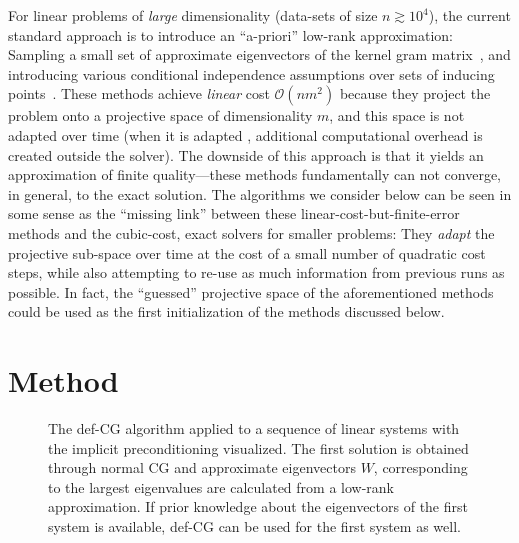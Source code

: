 \documentclass{article}
\begin{document}
For linear problems of \emph{large} dimensionality (data-sets of size $n\gtrsim 10^4$), the current standard approach is to introduce an ``a-priori'' low-rank approximation: Sampling a small set of approximate eigenvectors of the kernel gram matrix~\cite{NIPS2007_3182,NIPS2008_3495}, and introducing various conditional independence assumptions over sets of inducing points~\cite{NIPS2000_1866,quinonero05,snelson07a}. These methods achieve \emph{linear} cost $\mathcal{O}(nm^2)$ because they project the problem onto a projective space of dimensionality $m$, and this space is not adapted over time (when it is adapted \cite{titsias09a}, additional computational overhead is created outside the solver). The downside of this approach is that it yields an approximation of finite quality---these methods fundamentally can not converge, in general, to the exact solution. The algorithms we consider below can be seen in some sense as the ``missing link'' between these linear-cost-but-finite-error methods and the cubic-cost, exact solvers for smaller problems: They \emph{adapt} the projective sub-space over time at the cost of a small number of quadratic cost steps, while also attempting to re-use as much information from previous runs as possible. In fact, the ``guessed'' projective space of the aforementioned methods could be used as the first initialization of the methods discussed below.

\section{Method}
\label{sec:method}

\begin{figure}
\centering
\def\svgwidth{\linewidth}

\caption{\label{fig:def_cg} The def-CG algorithm applied to a sequence of linear systems with the implicit preconditioning visualized. The first solution is obtained through normal CG and approximate eigenvectors $W$, corresponding to the largest eigenvalues are calculated from a low-rank approximation. If prior knowledge about the eigenvectors of the first system is available, def-CG can be used for the first system as well.}
\end{figure}
\end{document}
